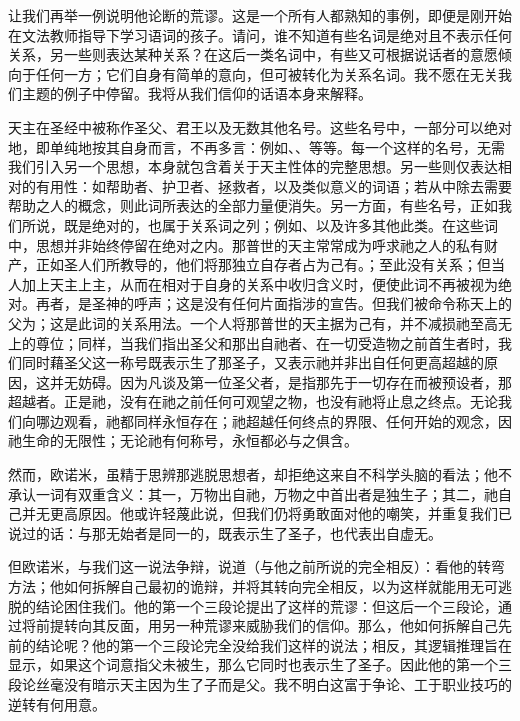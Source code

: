 让我们再举一例说明他论断的荒谬。这是一个所有人都熟知的事例，即便是刚开始在文法教师指导下学习语词的孩子。请问，谁不知道有些名词是绝对且不表示任何关系，另一些则表达某种关系？在这后一类名词中，有些又可根据说话者的意愿倾向于任何一方；它们自身有简单的意向，但可被转化为关系名词。我不愿在无关我们主题的例子中停留。我将从我们信仰的话语本身来解释。\par

天主在圣经中被称作圣父、君王以及无数其他名号。这些名号中，一部分可以绝对地，即单纯地按其自身而言，不再多言：例如、、等等。每一个这样的名号，无需我们引入另一个思想，本身就包含着关于天主性体的完整思想。另一些则仅表达相对的有用性：如帮助者、护卫者、拯救者，以及类似意义的词语；若从中除去需要帮助之人的概念，则此词所表达的全部力量便消失。另一方面，有些名号，正如我们所说，既是绝对的，也属于关系词之列；例如、以及许多其他此类。在这些词中，思想并非始终停留在绝对之内。那普世的天主常常成为呼求祂之人的私有财产，正如圣人们所教导的，他们将那独立自存者占为己有。；至此没有关系；但当人加上天主上主，从而在相对于自身的关系中收归含义时，便使此词不再被视为绝对。再者，是圣神的呼声；这是没有任何片面指涉的宣告。但我们被命令称天上的父为；这是此词的关系用法。一个人将那普世的天主据为己有，并不减损祂至高无上的尊位；同样，当我们指出圣父和那出自祂者、在一切受造物之前首生者时，我们同时藉圣父这一称号既表示生了那圣子，又表示祂并非出自任何更高超越的原因，这并无妨碍。因为凡谈及第一位圣父者，是指那先于一切存在而被预设者，那超越者。正是祂，没有在祂之前任何可观望之物，也没有祂将止息之终点。无论我们向哪边观看，祂都同样永恒存在；祂超越任何终点的界限、任何开始的观念，因祂生命的无限性；无论祂有何称号，永恒都必与之俱含。\par

然而，欧诺米，虽精于思辨那逃脱思想者，却拒绝这来自不科学头脑的看法；他不承认一词有双重含义：其一，万物出自祂，万物之中首出者是独生子；其二，祂自己并无更高原因。他或许轻蔑此说，但我们仍将勇敢面对他的嘲笑，并重复我们已说过的话：与那无始者是同一的，既表示生了圣子，也代表出自虚无。\par

但欧诺米，与我们这一说法争辩，说道（与他之前所说的完全相反）：看他的转弯方法；他如何拆解自己最初的诡辩，并将其转向完全相反，以为这样就能用无可逃脱的结论困住我们。他的第一个三段论提出了这样的荒谬：但这后一个三段论，通过将前提转向其反面，用另一种荒谬来威胁我们的信仰。那么，他如何拆解自己先前的结论呢？他的第一个三段论完全没给我们这样的说法；相反，其逻辑推理旨在显示，如果这个词意指父未被生，那么它同时也表示生了圣子。因此他的第一个三段论丝毫没有暗示天主因为生了子而是父。我不明白这富于争论、工于职业技巧的逆转有何用意。\par


